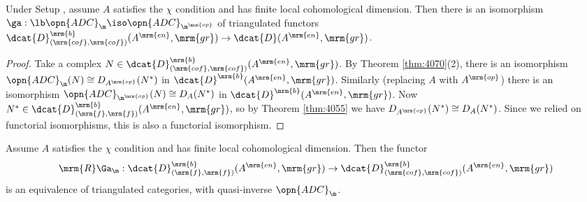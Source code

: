 \begin{cor} \label{cor:4080}   
Under Setup \tup{\ref{setup:3925}}, assume $A$ satisfies the $\chi$ condition 
and has finite local cohomological dimension. Then there is an isomorphism 
$\ga : \lb \opn{ADC}_{\m} \iso \opn{ADC}_{\m^{\mrm{op}}}$
of triangulated functors 
$\dcat{D}^{\mrm{b}}_{(\mrm{cof}, \mrm{cof})}(A^{\mrm{en}}, \mrm{gr}) \to 
\dcat{D}(A^{\mrm{en}}, \mrm{gr})$.
\end{cor}

\begin{proof}
Take a complex 
$N \in \dcat{D}^{\mrm{b}}_{(\mrm{cof}, \mrm{cof})}(A^{\mrm{en}}, \mrm{gr})$.
By Theorem \ref{thm:4070}(2), there is an isomorphism 
$\opn{ADC}_{\m}(N) \cong D_{A^{\mrm{op}}}(N^*)$
in $\dcat{D}^{\mrm{b}}(A^{\mrm{en}}, \mrm{gr})$.
Similarly (replacing $A$ with $A^{\mrm{op}}$) there is an isomorphism 
$\opn{ADC}_{\m^{\mrm{op}}}(N) \cong D_{A}(N^*)$
in $\dcat{D}^{\mrm{b}}(A^{\mrm{en}}, \mrm{gr})$.
Now 
$N^* \in \dcat{D}^{\mrm{b}}_{(\mrm{f}, \mrm{f})}(A^{\mrm{en}}, \mrm{gr})$,
so by Theorem \ref{thm:4055} we have 
$D_{A^{\mrm{op}}}(N^*) \cong D_{A}(N^*)$.
Since we relied on functorial isomorphisms, this is also a functorial 
isomorphism.   
\end{proof}

\begin{cor} \label{cor:4070}
Assume $A$ satisfies the $\chi$ condition and has finite local cohomological 
dimension. Then the functor 
\[ \mrm{R} \Ga_{\m} : 
\dcat{D}^{\mrm{b}}_{(\mrm{f}, \mrm{f})}(A^{\mrm{en}}, \mrm{gr}) \to
\dcat{D}^{\mrm{b}}_{(\mrm{cof}, \mrm{cof})}(A^{\mrm{en}}, \mrm{gr}) \]
is an equivalence of triangulated categories, with quasi-inverse
$\opn{ADC}_{\m}$. 
\end{cor}

